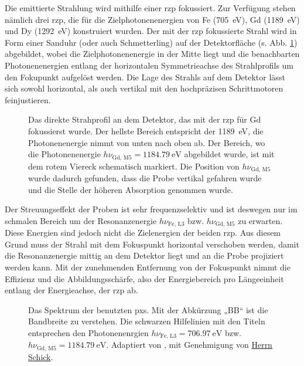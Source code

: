 \noindent
Die emittierte Strahlung wird mithilfe einer \gls{rzp} fokussiert. Zur Verfügung stehen nämlich drei \gls{rzp}, die für die Zielphotonenenergien von Fe (\SI{705}{\eV}), Gd (\SI{1189}{\eV}) und Dy (\SI{1292}{\eV}) konstruiert wurden. Der mit der \gls{rzp} fokussierte Strahl wird in Form einer Sanduhr (oder auch Schmetterling) auf der Detektorfläche (s. Abb. \ref{fig:butterfly_moench}) abgebildet, wobei die Zielphotonenenergie in der Mitte liegt und die benachbarten Photonenenergien entlang der horizontalen Symmetrieachse des Strahlprofils um den Fokupunkt aufgelöst werden. Die Lage des Strahls auf dem Detektor lässt sich sowohl horizontal, als auch vertikal mit den hochpräzisen Schrittmotoren feinjustieren.
\begin{figure}[H]
    \centering
    
    \caption{Das direkte Strahprofil an dem Detektor, das mit der \gls{rzp} für Gd fokussierst wurde. Der hellste Bereich entspricht der \SI{1189}{\eV}, die Photonenenergie nimmt von unten nach oben ab. Der Bereich, wo die Photonenenergie $h\nu_{\text{Gd, M5}} = \SI{1184,79}{\eV}$ abgebildet wurde, ist mit dem rotem Viereck schematisch markiert. Die Position von $h\nu_{\text{Gd, M5}}$ wurde dadurch gefunden, dass die Probe vertikal gefahren wurde und die Stelle der höheren Absorption genommen wurde.}
    \label{fig:butterfly_moench}
\end{figure}
\noindent
Der Streuungseffekt der Proben ist sehr frequenzselektiv und ist deswegen nur im schmalen Bereich um der Resonanzenergie $h\nu_{\text{Fe, L3}}$ bzw. $h\nu_{\text{Gd, M5}}$ zu erwarten. Diese Energien sind jedoch nicht die Zielenergien der beiden \gls{rzp}. Aus diesem Grund muss der Strahl mit dem Fokuspunkt horizontal verschoben werden, damit die Resonanzenergie mittig an dem Detektor liegt und an die Probe projiziert werden kann. Mit der zunehmenden Entfernung von der Fokuspunkt nimmt die Effizienz und die Abbildungsschärfe, also der Energiebereich pro Längeeinheit entlang der Energieachse, der \gls{rzp} ab. 
\begin{figure}[H]
    \centering
    
    \caption{Das Spektrum der benutzten \gls{pxs}. Mit der Abkürzung „BB“ ist die Bandbreite zu verstehen. Die schwarzen Hilfelinien mit den Titeln entsprechen den Photonenenrgien $h\nu_{\text{Fe, L3}} = \SI{706.97}{\eV}$ bzw. $h\nu_{\text{Gd, M5}} = \SI{1184,79}{\eV}$. Adaptiert von \cite{schick_laser-driven_2021}, mit Genehmigung von \href{https://orcid.org/0000-0001-7988-6489}{Herrn Schick}.}
    \label{fig:xps_spectrum}
\end{figure}
